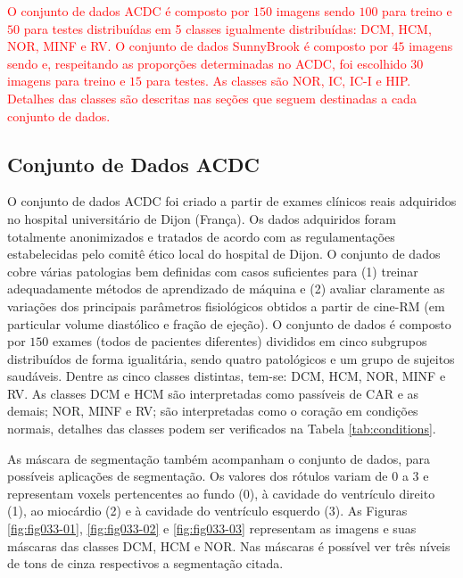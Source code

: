 \textcolor{red}{
O conjunto de dados ACDC é composto por $150$ imagens sendo $100$ para treino e $50$ para testes distribuídas em 5 classes igualmente distribuídas: \gls{DCM}, \gls{HCM}, \gls{NOR}, \gls{MINF} e \gls{RV}. O conjunto de dados SunnyBrook é composto por $45$ imagens sendo e, respeitando as proporções determinadas no ACDC, foi escolhido $30$ imagens para treino e $15$ para testes. As classes são NOR, IC, IC-I e HIP. Detalhes das classes são descritas nas seções que seguem destinadas a cada conjunto de dados.
}

\subsection{Conjunto de Dados ACDC} 
\label{subsec:cap4_acdc}

O conjunto de dados \gls{ACDC} foi criado a partir de exames clínicos reais adquiridos no hospital universitário de Dijon (França). Os dados adquiridos foram totalmente anonimizados e tratados de acordo com as regulamentações estabelecidas pelo comitê ético local do hospital de Dijon. O conjunto de dados cobre várias patologias bem definidas com casos suficientes para (1) treinar adequadamente métodos de aprendizado de máquina e (2) avaliar claramente as variações dos principais parâmetros fisiológicos obtidos a partir de cine-RM (em particular volume diastólico e fração de ejeção). O conjunto de dados é composto por $150$ exames (todos de pacientes diferentes) divididos em cinco subgrupos distribuídos de forma igualitária, sendo quatro patológicos e um grupo de sujeitos saudáveis. Dentre as cinco classes distintas, tem-se: \gls{DCM}, \gls{HCM}, \gls{NOR}, \gls{MINF} e \gls{RV}. As classes \gls{DCM} e \gls{HCM} são interpretadas como passíveis de \gls{CAR} e as demais; \gls{NOR}, \gls{MINF} e \gls{RV}; são interpretadas como o coração em condições normais, detalhes das classes podem ser verificados na Tabela \ref{tab:conditions}. 

As máscara de segmentação também acompanham o conjunto de dados, para possíveis aplicações de segmentação. Os valores dos rótulos variam de $0$ a $3$ e representam voxels pertencentes ao fundo (0), à cavidade do ventrículo direito (1), ao miocárdio (2) e à cavidade do ventrículo esquerdo (3). As Figuras \ref{fig:fig033-01}, \ref{fig:fig033-02} e \ref{fig:fig033-03} representam as imagens e suas máscaras das classes \gls{DCM}, \gls{HCM} e \gls{NOR}. Nas máscaras é possível ver três níveis de tons de cinza respectivos a segmentação citada.

